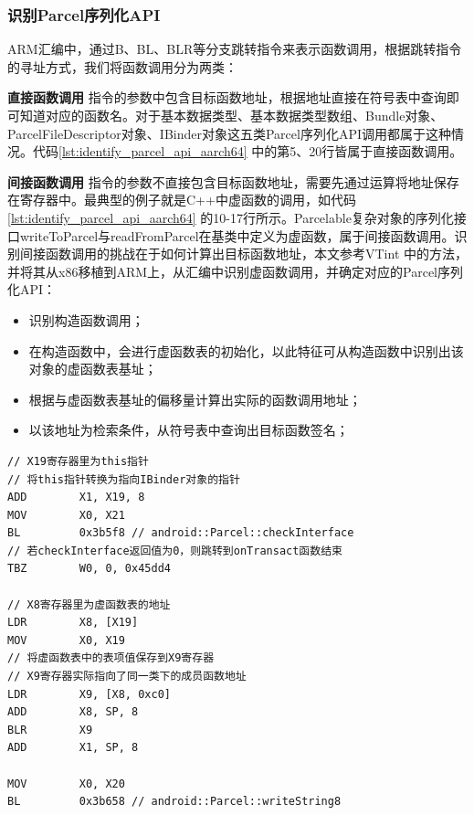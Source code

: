 \documentclass[winfonts,master,twoside]{njuthesis}
\begin{document}
\subsubsection{识别Parcel序列化API}

ARM汇编中，通过B、BL、BLR等分支跳转指令来表示函数调用，根据跳转指令的寻址方式，我们将函数调用分为两类：

\textbf{直接函数调用} \quad 指令的参数中包含目标函数地址，根据地址直接在符号表中查询即可知道对应的函数名。对于基本数据类型、基本数据类型数组、Bundle对象、ParcelFileDescriptor对象、IBinder对象这五类Parcel序列化API调用都属于这种情况。代码\ref{lst:identify_parcel_api_aarch64} 中的第5、20行皆属于直接函数调用。

\textbf{间接函数调用} \quad 指令的参数不直接包含目标函数地址，需要先通过运算将地址保存在寄存器中。最典型的例子就是C++中虚函数的调用，如代码\ref{lst:identify_parcel_api_aarch64} 的10-17行所示。Parcelable复杂对象的序列化接口writeToParcel与readFromParcel在基类中定义为虚函数，属于间接函数调用。识别间接函数调用的挑战在于如何计算出目标函数地址，本文参考VTint \cite{zhang2015vtint}中的方法，并将其从x86移植到ARM上，从汇编中识别虚函数调用，并确定对应的Parcel序列化API：
\begin{itemize}
	\item 识别构造函数调用；
	\item 在构造函数中，会进行虚函数表的初始化，以此特征可从构造函数中识别出该对象的虚函数表基址；
	\item 根据与虚函数表基址的偏移量计算出实际的函数调用地址；
	\item 以该地址为检索条件，从符号表中查询出目标函数签名；
\end{itemize}

\begin{lstlisting}[caption={Parcel序列化过程AArch64汇编},label={lst:identify_parcel_api_aarch64}] 
// X19寄存器里为this指针
// 将this指针转换为指向IBinder对象的指针
ADD        X1, X19, 8
MOV        X0, X21
BL         0x3b5f8 // android::Parcel::checkInterface
// 若checkInterface返回值为0，则跳转到onTransact函数结束
TBZ        W0, 0, 0x45dd4

// X8寄存器里为虚函数表的地址
LDR        X8, [X19]
MOV        X0, X19
// 将虚函数表中的表项值保存到X9寄存器
// X9寄存器实际指向了同一类下的成员函数地址
LDR        X9, [X8, 0xc0]
ADD        X8, SP, 8
BLR        X9
ADD        X1, SP, 8

MOV        X0, X20
BL         0x3b658 // android::Parcel::writeString8
\end{lstlisting}
\end{document}
